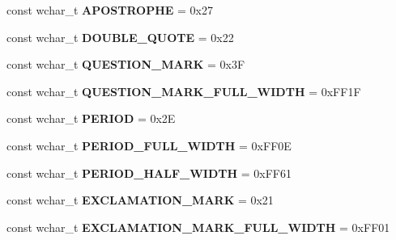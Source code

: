 \begin{DoxyCompactItemize}
\item 
\hypertarget{group___indexing_ga95b4c8ef12a97998a10241c219b6a293}{const wchar\-\_\-t {\bfseries A\-P\-O\-S\-T\-R\-O\-P\-H\-E} = 0x27}\label{group___indexing_ga95b4c8ef12a97998a10241c219b6a293}

\item 
\hypertarget{group___indexing_ga437b32d2fe22094a09207d392499011d}{const wchar\-\_\-t {\bfseries D\-O\-U\-B\-L\-E\-\_\-\-Q\-U\-O\-T\-E} = 0x22}\label{group___indexing_ga437b32d2fe22094a09207d392499011d}

\item 
\hypertarget{group___indexing_ga5bab91c680bd568506a7c426025cc556}{const wchar\-\_\-t {\bfseries Q\-U\-E\-S\-T\-I\-O\-N\-\_\-\-M\-A\-R\-K} = 0x3\-F}\label{group___indexing_ga5bab91c680bd568506a7c426025cc556}

\item 
\hypertarget{group___indexing_gaaabf3f31fbd6eb42f3f5e6284e830289}{const wchar\-\_\-t {\bfseries Q\-U\-E\-S\-T\-I\-O\-N\-\_\-\-M\-A\-R\-K\-\_\-\-F\-U\-L\-L\-\_\-\-W\-I\-D\-T\-H} = 0x\-F\-F1\-F}\label{group___indexing_gaaabf3f31fbd6eb42f3f5e6284e830289}

\item 
\hypertarget{group___indexing_ga71e6ad9cc4cbe563b4ecd041584c84a5}{const wchar\-\_\-t {\bfseries P\-E\-R\-I\-O\-D} = 0x2\-E}\label{group___indexing_ga71e6ad9cc4cbe563b4ecd041584c84a5}

\item 
\hypertarget{group___indexing_ga6534dd837125dd3b296261f9685cc77a}{const wchar\-\_\-t {\bfseries P\-E\-R\-I\-O\-D\-\_\-\-F\-U\-L\-L\-\_\-\-W\-I\-D\-T\-H} = 0x\-F\-F0\-E}\label{group___indexing_ga6534dd837125dd3b296261f9685cc77a}

\item 
\hypertarget{group___indexing_ga7048c85dfb75ee97f315d7c59e7c2009}{const wchar\-\_\-t {\bfseries P\-E\-R\-I\-O\-D\-\_\-\-H\-A\-L\-F\-\_\-\-W\-I\-D\-T\-H} = 0x\-F\-F61}\label{group___indexing_ga7048c85dfb75ee97f315d7c59e7c2009}

\item 
\hypertarget{group___indexing_gae55eb18af6a8f78abf321431903ae574}{const wchar\-\_\-t {\bfseries E\-X\-C\-L\-A\-M\-A\-T\-I\-O\-N\-\_\-\-M\-A\-R\-K} = 0x21}\label{group___indexing_gae55eb18af6a8f78abf321431903ae574}

\item 
\hypertarget{group___indexing_gabf0e98ffc1048ff4bee9600eb6a232d7}{const wchar\-\_\-t {\bfseries E\-X\-C\-L\-A\-M\-A\-T\-I\-O\-N\-\_\-\-M\-A\-R\-K\-\_\-\-F\-U\-L\-L\-\_\-\-W\-I\-D\-T\-H} = 0x\-F\-F01}\label{group___indexing_gabf0e98ffc1048ff4bee9600eb6a232d7}


\end{DoxyCompactItemize}
